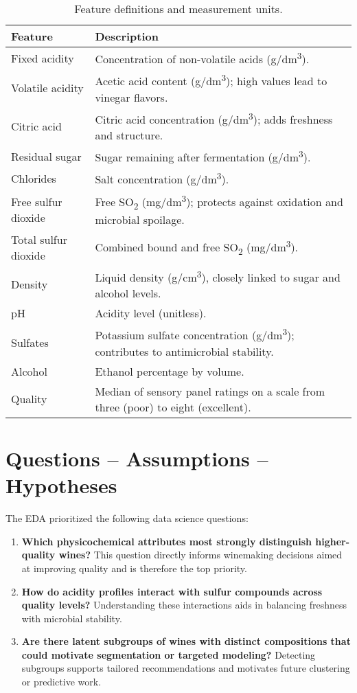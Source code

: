 \documentclass[11pt]{article}
\begin{document}
\begin{table}[H]
  \centering
  \caption{Feature definitions and measurement units.}
  \label{tab:feature-definitions}
  \begin{tabular}{p{}p{}}
    \toprule
    \textbf{Feature} & \textbf{Description} \\
    \midrule
    Fixed acidity & Concentration of non-volatile acids (g/dm\textsuperscript{3}). \\
    Volatile acidity & Acetic acid content (g/dm\textsuperscript{3}); high values lead to vinegar flavors. \\
    Citric acid & Citric acid concentration (g/dm\textsuperscript{3}); adds freshness and structure. \\
    Residual sugar & Sugar remaining after fermentation (g/dm\textsuperscript{3}). \\
    Chlorides & Salt concentration (g/dm\textsuperscript{3}). \\
    Free sulfur dioxide & Free SO\textsubscript{2} (mg/dm\textsuperscript{3}); protects against oxidation and microbial spoilage. \\
    Total sulfur dioxide & Combined bound and free SO\textsubscript{2} (mg/dm\textsuperscript{3}). \\
    Density & Liquid density (g/cm\textsuperscript{3}), closely linked to sugar and alcohol levels. \\
    pH & Acidity level (unitless). \\
    Sulfates & Potassium sulfate concentration (g/dm\textsuperscript{3}); contributes to antimicrobial stability. \\
    Alcohol & Ethanol percentage by volume. \\
    Quality & Median of sensory panel ratings on a scale from three (poor) to eight (excellent). \\
    \bottomrule
  \end{tabular}
\end{table}

\section{Questions -- Assumptions -- Hypotheses}
The EDA prioritized the following data science questions:
\begin{enumerate}
  \item \textbf{Which physicochemical attributes most strongly distinguish higher-quality wines?} This question directly informs winemaking decisions aimed at improving quality and is therefore the top priority.
  \item \textbf{How do acidity profiles interact with sulfur compounds across quality levels?} Understanding these interactions aids in balancing freshness with microbial stability.
  \item \textbf{Are there latent subgroups of wines with distinct compositions that could motivate segmentation or targeted modeling?} Detecting subgroups supports tailored recommendations and motivates future clustering or predictive work.
\end{enumerate}
\end{document}
